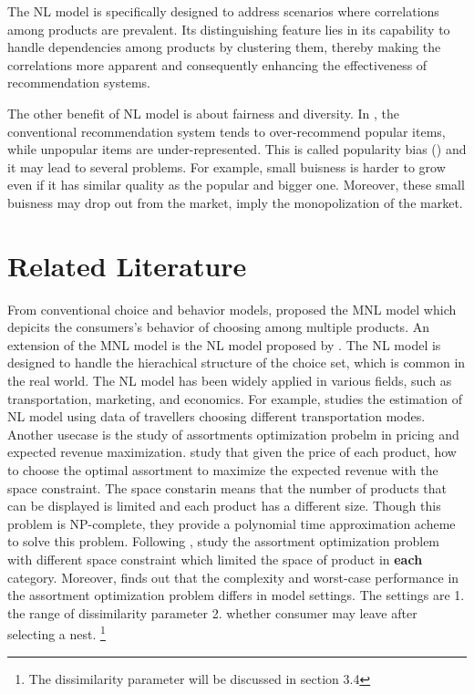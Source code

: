 \documentclass[12pt]{article}
\theoremstyle{definition}
\begin{document}
\begin{sloppypar}
The NL model is specifically designed to address scenarios where correlations among products are prevalent. Its distinguishing feature lies in its capability to handle dependencies among products by clustering them, thereby making the correlations more apparent and consequently enhancing the effectiveness of recommendation systems.

The other benefit of NL model is about fairness and diversity. In \textcite{zhao2024}, the conventional recommendation system tends to over-recommend popular items, while unpopular items are under-represented. This is called popularity bias (\textcite{DBLP:journals/corr/abs-1907-13286}) and it may lead to several problems. For example, small buisness is harder to grow even if it has similar quality as the popular and bigger one. Moreover, these small buisness may drop out from the market, imply the monopolization of the market.
\section{Related Literature}
From conventional choice and behavior models, \textcite{mcfadden1972} proposed the MNL model which depicits the consumers's behavior of choosing among multiple products. An extension of the MNL model is the NL model proposed by \textcite{williams1977}. The NL model is designed to handle the hierachical structure of the choice set, which is common in the real world. The NL model has been widely applied in various fields, such as transportation, marketing, and economics. For example, \textcite{hensher2002} studies the estimation of NL model using data of travellers choosing different transportation modes. Another usecase is the study of assortments optimization probelm in pricing and expected revenue maximization. \textcite{rusmevichientong2009} study that given the price of each product, how to choose the optimal assortment to maximize the expected revenue with the space constraint. The space constarin means that the number of products that can be displayed is limited and each product has a different size. Though this problem is NP-complete, they provide a polynomial time approximation acheme to solve this problem. Following \textcite{rusmevichientong2009}, \textcite{gallego2014} study the assortment optimization problem with different space constraint which limited the space of product in \textbf{each} category. Moreover, \textcite{davis2014} finds out that the complexity and worst-case performance in the assortment optimization problem differs in model settings. The settings are 1. the range of dissimilarity parameter 2. whether consumer may leave after selecting a nest. \footnote{The dissimilarity parameter will be discussed in section 3.4}


\end{sloppypar}
\end{document}
